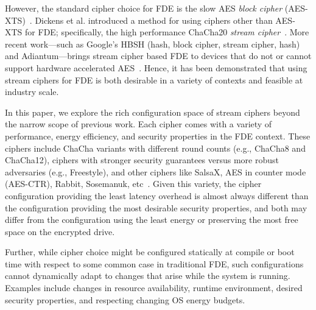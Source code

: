 However, the standard cipher choice for FDE is the slow AES
\emph{block cipher} (AES-XTS)~\cite{XTS, XTSComments, NISTXTS}.
Dickens et al. introduced a method for using ciphers other than
AES-XTS for FDE; specifically, the high performance ChaCha20
\emph{stream cipher}~\cite{StrongBox, ChaCha20}. More recent
work---such as Google's HBSH (hash, block cipher, stream cipher, hash)
and Adiantum---brings stream cipher based FDE to devices that do not
or cannot support hardware accelerated AES~\cite{Adiantum}. Hence, it
has been demonstrated that using stream ciphers for FDE is both
desirable in a variety of contexts and feasible at industry scale.

In this paper, we explore the rich configuration space of stream
ciphers beyond the narrow scope of previous work. Each cipher comes
with a variety of performance, energy efficiency, and security
properties in the FDE context.  These ciphers include ChaCha variants
with different round counts (e.g., ChaCha8 and ChaCha12), ciphers with
stronger security guarantees versus more robust adversaries (e.g.,
Freestyle), and other ciphers like SalsaX, AES in counter mode
(AES-CTR), Rabbit, Sosemanuk, etc~\cite{Freestyle, SalsaX, Rabbit,
  Sosemanuk, ChaCha20, AESCTR}.  Given this variety, the cipher configuration
providing the least latency overhead is almost always different than
the configuration providing the most desirable security properties,
and both may differ from the configuration using the least energy or
preserving the most free space on the encrypted drive.

Further, while cipher choice might be configured statically at compile or boot
time with respect to some common case in traditional FDE, such configurations
cannot dynamically adapt to changes that arise while the system is running.
Examples include changes in resource availability, runtime environment, desired
security properties, and respecting changing OS energy budgets.

